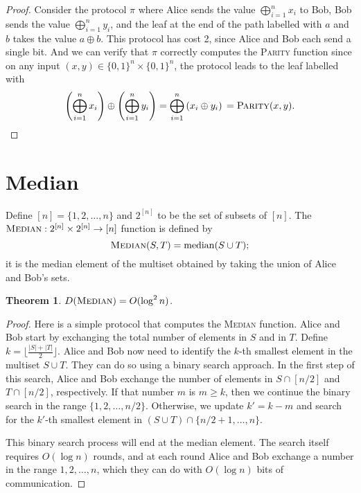\documentclass[11pt,oneside]{book}
\theoremstyle{plain}
\newtheorem{theorem}{Theorem}
\theoremstyle{definition}
\theoremstyle{plain}
\begin{document}
\begin{proof}
	Consider the protocol $\pi$ where Alice sends the value $\bigoplus_{i=1}^n x_i$ to Bob, Bob sends the value $\bigoplus_{i=1}^n y_i$, and the leaf at the end of the path labelled with $a$ and $b$ takes the value $a \oplus b$. This protocol has cost 2, since Alice and Bob each send a single bit. And we can verify that $\pi$ correctly computes the \textsc{Parity} function since on any input $(x,y) \in \{0,1\}^n \times \{0,1\}^n$, the protocol leads to the leaf labelled with
	\[
	\left( \bigoplus_{i=1}^n x_i \right) \oplus 
	\left( \bigoplus_{i=1}^n y_i \right) 
	=  \bigoplus_{i=1}^n \left(x_i \oplus y_i \right) \\
	= \textsc{Parity}(x,y). \qedhere
	\]
\end{proof}


\section{Median}
Define $[n] = \{1,2,\ldots,n\}$ and $2^{[n]}$ to be the set of subsets of $[n]$. The $\textsc{Median} : 2^{[n]} \times 2^{[n]} \to [n]$ function is defined by
\[
\textsc{Median}(S,T) = \mathrm{median}(S \cup T);
\]
it is the median element of the multiset obtained by taking the union of Alice and Bob's sets. 

\begin{theorem}
	$D(\textsc{Median}) = O(\log^2 n)$.
\end{theorem}

\begin{proof}
	Here is a simple protocol that computes the \textsc{Median} function. Alice and Bob start by exchanging the total number of elements in $S$ and in $T$. Define $k = \lfloor \frac{|S| + |T|}2 \rfloor$. Alice and Bob now need to identify the $k$-th smallest element in the multiset $S \cup T$. They can do so using a binary search approach. In the first step of this search, Alice and Bob exchange the number of elements in $S \cap [n/2]$ and $T \cap [n/2]$, respectively. If that number $m$ is $m \ge k$, then we continue the binary search in the range $\{1,2,\ldots,n/2\}$. Otherwise, we update $k' = k - m$ and search for the $k'$-th smallest element in $(S \cup T) \cap \{n/2+1,\ldots,n\}$.
	
	This binary search process will end at the median element. The search itself requires $O( \log n)$ rounds, and at each round Alice and Bob exchange a number in the range $1,2,\ldots,n$, which they can do with $O(\log n)$ bits of communication.
\end{proof}
\end{document}
